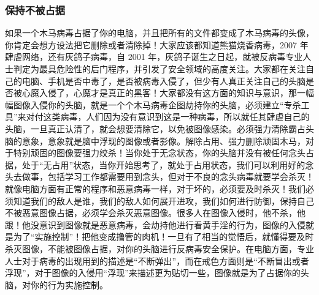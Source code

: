 \subsubsection{保持不被占据}

如果一个木马病毒占据了你的电脑，并且把所有的文件都变成了木马病毒的头像，你肯定会想方设法把它删除或者清除掉！大家应该都知道熊猫烧香病毒，2007 年肆虐网络，还有灰鸽子病毒，自 2001 年，灰鸽子诞生之日起，就被反病毒专业人士判定为最具危险性的后门程序，并引发了安全领域的高度关注。大家都在关注自己的电脑、手机是否中毒了，是否被病毒入侵了，但少有人真正关注自己的头脑是否被心魔入侵了，心魔才是真正的黑客！大家都没有这方面的知识与意识，那一幅幅图像入侵你的头脑，就是一个个木马病毒企图劫持你的头脑，必须建立“专杀工具”来对付这类病毒，人们因为没有意识到这是一种病毒，所以就任其肆虐自己的头脑，一旦真正认清了，就会想要清除它，以免被图像感染。必须强力清除霸占头脑的意象，意象就是脑中浮现的图像或者影像。解除占用、强力删除顽固木马，对于特别顽固的图像要强力绞杀！当你处于无念状态，你的头脑并没有被任何念头占据，处于“无占用”状态，当你开始思考了，就处于占用状态，我们可以利用好的念头去做事，包括学习工作都需要用到念头，但对于不良的念头病毒就要学会杀灭！就像电脑方面有正常的程序和恶意病毒一样，对于坏的，必须要及时杀灭！我们必须知道我们的敌人是谁，我们的敌人如何展开进攻，我们如何进行防御，保持自己不被恶意图像占据，必须学会杀灭恶意图像。很多人在图像入侵时，他不杀，他跟！他没意识到图像就是恶意病毒，会劫持他进行看黄手淫的行为，图像的入侵就是为了“实施控制”！把他变成撸管的肉机！一旦有了相当的觉悟后，就懂得要及时杀灭图像，不能被图像占据，对你的头脑进行反病毒安全保护。在电脑方面，专业人士对于病毒的出现用到的描述是“不断弹出”，而在戒色方面则是“不断冒出或者浮现”，对于图像的入侵用“浮现”来描述更为贴切一些，图像就是为了占据你的头脑，对你的行为实施控制。

